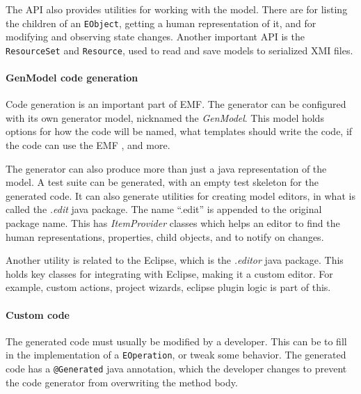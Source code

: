 The \acrshort{API} also provides utilities for working with the model.
There are  for listing the children of an \texttt{EObject}, getting a human representation of it, and for modifying and observing state changes.
Another important \acrshort{API} is the \texttt{ResourceSet} and \texttt{Resource}, used to read and save models to serialized \acrshort{XMI} files.

\paragraph{GenModel code generation}
Code generation is an important part of \acrshort{EMF}.
The generator can be configured with its own generator model, nicknamed the \textit{GenModel}.
This model holds options for how the code will be named, what templates should write the code, if the code can use the \acrshort{EMF} , and more.


The generator can also produce more than just a java representation of the model.
A test suite can be generated, with an empty test skeleton for the generated code.
It can also generate utilities for creating model editors, in what is called the \textit{.edit} java package.
The name ``.edit'' is appended to the original package name.
This has \textit{ItemProvider} classes which helps an editor to find the human representations, properties, child objects, and to notify on changes.


Another utility is related to the \gls{Eclipse}, which is the \textit{.editor} java package.
This holds key classes for integrating with \gls{Eclipse}, making it a custom editor.
For example, custom actions, project wizards, eclipse plugin logic is part of this.


\paragraph{Custom code}
The generated code must usually be modified by a developer.
This can be to fill in the implementation of a \texttt{EOperation}, or tweak some behavior.
The generated code has a \texttt{@Generated} java annotation, which the developer changes to prevent the code generator from overwriting the method body.
